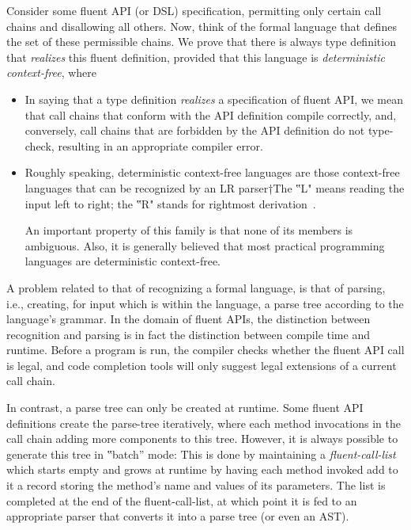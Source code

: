 Consider some fluent API (or DSL) specification, permitting only certain call
chains and disallowing all others.
Now, think of the formal language that defines the set of these permissible
chains.
We prove that there is always \Java type definition that
  \emph{realizes} this fluent definition, provided that this
  language is \emph{deterministic context-free}, where
\begin{itemize}
  \item In saying that a type definition \emph{realizes} a specification of
    fluent API, we mean that call chains that conform with the API definition
    compile correctly, and, conversely, call chains that are forbidden by the
    API definition do not type-check, resulting in an appropriate compiler
    error. \item Roughly speaking, deterministic context-free languages are
    those context-free languages that can be recognized by an LR parser†{The
      ‟L" means reading the input left to right; the ‟R" stands for rightmost
    derivation}~\cite{Aho:Sethi:Ullman:86}.
    \par
    An important property of this family is that none of its members is
    ambiguous. Also, it is generally believed that most practical programming
    languages are deterministic context-free.
\end{itemize}

A problem related to that of recognizing a formal language,
is that of parsing, i.e., creating, for input which is within the language,
  a parse tree according to the language's grammar.
In the domain of fluent APIs, the distinction between recognition and parsing
is in fact the distinction between compile time and runtime.
Before a program is run, the compiler checks whether the fluent API call is
legal, and code completion tools will only suggest legal extensions of a
current call chain.

In contrast, a parse tree can only be created at runtime.
Some fluent API definitions create the parse-tree
  iteratively, where each method invocations in the call chain adding
  more components to this tree.
However, it is always possible to generate this tree in ‟batch” mode:
This is done by maintaining a \emph{fluent-call-list} which
  starts empty and grows at runtime by having each method invoked add to it
  a record storing the method's name and values of its parameters.
The list is completed at the end of the fluent-call-list, at which point it is
fed to an appropriate parser that converts it into a parse tree (or even an
AST).

